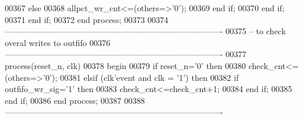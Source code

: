 \begin{DoxyCode}
00367             \textcolor{keywordflow}{else} 
00368               \textcolor{vhdlchar}{allpct_wr_cnt}\textcolor{vhdlchar}{<=}\textcolor{vhdlchar}{(}\textcolor{keywordflow}{others}\textcolor{vhdlchar}{=}\textcolor{vhdlchar}{>}\textcolor{vhdlchar}{'}\textcolor{vhdllogic}{}\textcolor{vhdllogic}{0}\textcolor{vhdlchar}{'}\textcolor{vhdlchar}{)};
00369             \textcolor{keywordflow}{end} \textcolor{keywordflow}{if};
00370           \textcolor{keywordflow}{end} \textcolor{keywordflow}{if};
00371         \textcolor{keywordflow}{end} \textcolor{keywordflow}{if};
00372     \textcolor{keywordflow}{end} \textcolor{keywordflow}{process};  
00373     
00374 \textcolor{keyword}{-------------------------------------------------------------------------------}
00375 \textcolor{keyword}{-- to check overal writes to outfifo}
00376 \textcolor{keyword}{-------------------------------------------------------------------------------   }
00377       \textcolor{keywordflow}{process}(reset_n, clk)
00378 \textcolor{vhdlkeyword}{    begin}
00379       \textcolor{keywordflow}{if} \textcolor{vhdlchar}{reset_n}\textcolor{vhdlchar}{=}\textcolor{vhdlchar}{'}\textcolor{vhdllogic}{}\textcolor{vhdllogic}{0}\textcolor{vhdlchar}{'} \textcolor{keywordflow}{then}
00380           \textcolor{vhdlchar}{check_cnt}\textcolor{vhdlchar}{<=}\textcolor{vhdlchar}{(}\textcolor{keywordflow}{others}\textcolor{vhdlchar}{=}\textcolor{vhdlchar}{>}\textcolor{vhdlchar}{'}\textcolor{vhdllogic}{}\textcolor{vhdllogic}{0}\textcolor{vhdlchar}{'}\textcolor{vhdlchar}{)};
00381         \textcolor{keywordflow}{elsif} \textcolor{vhdlchar}{(}\textcolor{vhdlchar}{clk}\textcolor{vhdlchar}{'}\textcolor{vhdlkeyword}{event} \textcolor{keywordflow}{and} \textcolor{vhdlchar}{clk} \textcolor{vhdlchar}{=} \textcolor{vhdlchar}{'}\textcolor{vhdllogic}{}\textcolor{vhdllogic}{1}\textcolor{vhdlchar}{'}\textcolor{vhdlchar}{)} \textcolor{keywordflow}{then}
00382           \textcolor{keywordflow}{if} \textcolor{vhdlchar}{outfifo_wr_sig}\textcolor{vhdlchar}{=}\textcolor{vhdlchar}{'}\textcolor{vhdllogic}{}\textcolor{vhdllogic}{1}\textcolor{vhdlchar}{'} \textcolor{keywordflow}{then}
00383               \textcolor{vhdlchar}{check_cnt}\textcolor{vhdlchar}{<=}\textcolor{vhdlchar}{check_cnt}\textcolor{vhdlchar}{+}\textcolor{vhdllogic}{}\textcolor{vhdllogic}{1};
00384           \textcolor{keywordflow}{end} \textcolor{keywordflow}{if};
00385         \textcolor{keywordflow}{end} \textcolor{keywordflow}{if};
00386     \textcolor{keywordflow}{end} \textcolor{keywordflow}{process};     
00387          
00388 \textcolor{keyword}{-------------------------------------------------------------------------------}

\end{DoxyCode}
